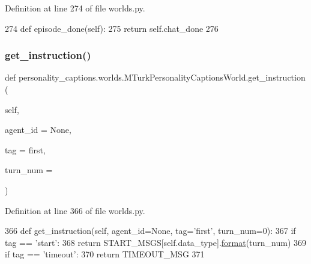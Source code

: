 Definition at line 274 of file worlds.\+py.


\begin{DoxyCode}
274     \textcolor{keyword}{def }episode\_done(self):
275         \textcolor{keywordflow}{return} self.chat\_done
276 
\end{DoxyCode}
\mbox{\label{classpersonality__captions_1_1worlds_1_1MTurkPersonalityCaptionsWorld_a4e9a57d65cc93af5741f56597a970618}} 
\subsubsection{\texorpdfstring{get\+\_\+instruction()}{get\_instruction()}}
{\footnotesize\ttfamily def personality\+\_\+captions.\+worlds.\+M\+Turk\+Personality\+Captions\+World.\+get\+\_\+instruction (\begin{DoxyParamCaption}\item[{}]{self,  }\item[{}]{agent\+\_\+id = {\ttfamily None},  }\item[{}]{tag = {\ttfamily \textquotesingle{}first\textquotesingle{}},  }\item[{}]{turn\+\_\+num = {} }\end{DoxyParamCaption})}



Definition at line 366 of file worlds.\+py.


\begin{DoxyCode}
366     \textcolor{keyword}{def }get\_instruction(self, agent\_id=None, tag='first', turn\_num=0):
367         \textcolor{keywordflow}{if} tag == \textcolor{stringliteral}{'start'}:
368             \textcolor{keywordflow}{return} START\_MSGS[self.data\_type].\hyperlink{namespaceparlai_1_1chat__service_1_1services_1_1messenger_1_1shared__utils_a32e2e2022b824fbaf80c747160b52a76}{format}(turn\_num)
369         \textcolor{keywordflow}{if} tag == \textcolor{stringliteral}{'timeout'}:
370             \textcolor{keywordflow}{return} TIMEOUT\_MSG
371 
\end{DoxyCode}
\mbox{\label{classpersonality__captions_1_1worlds_1_1MTurkPersonalityCaptionsWorld_ab682688b0f65bc5162cb77f3d96fafc4}} 
